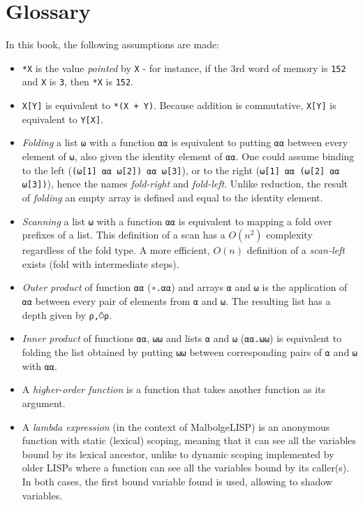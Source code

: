 
\chapter*{Glossary}

\par In this book, the following assumptions are made:

\begin{itemize}
    \item \verb|*X| is the value \textit{pointed} by \verb|X| - for instance, if the 3rd word of memory is \verb|152| and \verb|X| is \verb|3|, then \verb|*X| is \verb|152|.
    \item \verb|X[Y]| is equivalent to \verb|*(X + Y)|. Because addition is commutative, \verb|X[Y]| is equivalent to \verb|Y[X]|.
    \item \textit{Folding} a list \verb|⍵| with a function \verb|⍺⍺| is equivalent to putting \verb|⍺⍺| between every element of \verb|⍵|, also given the identity element of \verb|⍺⍺|. One could assume binding to the left (\verb|(⍵[1] ⍺⍺ ⍵[2]) ⍺⍺ ⍵[3]|), or to the right (\verb|⍵[1] ⍺⍺ (⍵[2] ⍺⍺ ⍵[3])|), hence the names \textit{fold-right} and \textit{fold-left}. Unlike reduction, the result of \textit{folding} an empty array is defined and equal to the identity element.
    \item \textit{Scanning} a list \verb|⍵| with a function \verb|⍺⍺| is equivalent to mapping a fold over prefixes of a list. This definition of a scan has a $O(n^2)$ complexity regardless of the fold type. A more efficient, $O(n)$ definition of a \textit{scan-left} exists (fold with intermediate steps).
    \item \textit{Outer product} of function \verb|⍺⍺| (\verb|∘.⍺⍺|) and arrays \verb|⍺| and \verb|⍵| is the application of \verb|⍺⍺| between every pair of elements from \verb|⍺| and \verb|⍵|. The resulting list has a depth given by \verb|⍴,⍥⍴|.
    \item \textit{Inner product} of functions \verb|⍺⍺|, \verb|⍵⍵| and lists \verb|⍺| and \verb|⍵| (\verb|⍺⍺.⍵⍵|) is equivalent to folding the list obtained by putting \verb|⍵⍵| between corresponding pairs of \verb|⍺| and \verb|⍵| with \verb|⍺⍺|.
    \item A \textit{higher-order function} is a function that takes another function as its argument.
    \item A \textit{lambda expression} (in the context of MalbolgeLISP) is an anonymous function with static (lexical) scoping, meaning that it can see all the variables bound by its lexical ancestor, unlike to dynamic scoping implemented by older LISPs where a function can see all the variables bound by its caller(s). In both cases, the first bound variable found is used, allowing to shadow variables.

\end{itemize}
